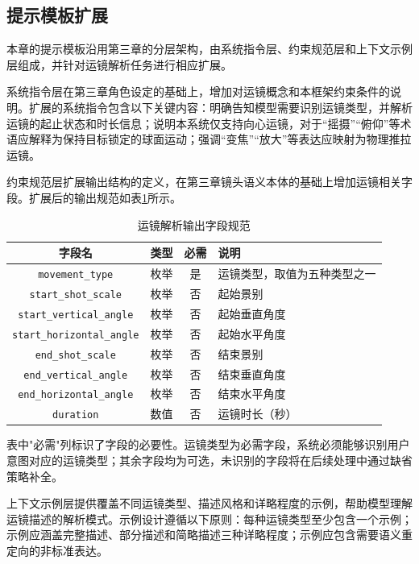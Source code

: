 \subsection{提示模板扩展}

本章的提示模板沿用第三章的分层架构，由系统指令层、约束规范层和上下文示例层组成，并针对运镜解析任务进行相应扩展。

系统指令层在第三章角色设定的基础上，增加对运镜概念和本框架约束条件的说明。扩展的系统指令包含以下关键内容：明确告知模型需要识别运镜类型，并解析运镜的起止状态和时长信息；说明本系统仅支持向心运镜，对于“摇摄”“俯仰”等术语应解释为保持目标锁定的球面运动；强调“变焦”“放大”等表达应映射为物理推拉运镜。

约束规范层扩展输出结构的定义，在第三章镜头语义本体的基础上增加运镜相关字段。扩展后的输出规范如表\ref{tab:movement_output_schema}所示。

\begin{table}[htbp]
\centering
\caption{运镜解析输出字段规范}
\label{tab:movement_output_schema}
\begin{tabular}{cccp{4.5cm}}
\toprule
字段名 & 类型 & 必需 & 说明 \\
\midrule
\texttt{movement\_type} & 枚举 & 是 & 运镜类型，取值为五种类型之一 \\
\texttt{start\_shot\_scale} & 枚举 & 否 & 起始景别 \\
\texttt{start\_vertical\_angle} & 枚举 & 否 & 起始垂直角度 \\
\texttt{start\_horizontal\_angle} & 枚举 & 否 & 起始水平角度 \\
\texttt{end\_shot\_scale} & 枚举 & 否 & 结束景别 \\
\texttt{end\_vertical\_angle} & 枚举 & 否 & 结束垂直角度 \\
\texttt{end\_horizontal\_angle} & 枚举 & 否 & 结束水平角度 \\
\texttt{duration} & 数值 & 否 & 运镜时长（秒） \\
\bottomrule
\end{tabular}
\end{table}

表中"必需"列标识了字段的必要性。运镜类型为必需字段，系统必须能够识别用户意图对应的运镜类型；其余字段均为可选，未识别的字段将在后续处理中通过缺省策略补全。

上下文示例层提供覆盖不同运镜类型、描述风格和详略程度的示例，帮助模型理解运镜描述的解析模式。示例设计遵循以下原则：每种运镜类型至少包含一个示例；示例应涵盖完整描述、部分描述和简略描述三种详略程度；示例应包含需要语义重定向的非标准表达。

